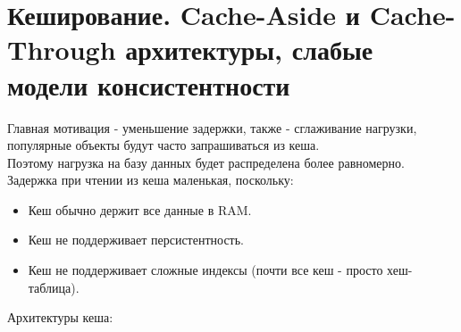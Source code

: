\section{Кеширование. Cache-Aside и Cache-Through архитектуры, слабые модели консистентности}
    Главная мотивация - уменьшение задержки, также - сглаживание нагрузки, популярные объекты будут часто запрашиваться из кеша. \\
    Поэтому нагрузка на базу данных будет распределена более равномерно.\\
    Задержка при чтении из кеша маленькая, поскольку:\\
    \begin{itemize}
      \item Кеш обычно держит все данные в RAM.
      \item Кеш не поддерживает персистентность.
      \item Кеш не поддерживает сложные индексы (почти все кеш - просто хеш-таблица).
    \end{itemize}
    Архитектуры кеша:
